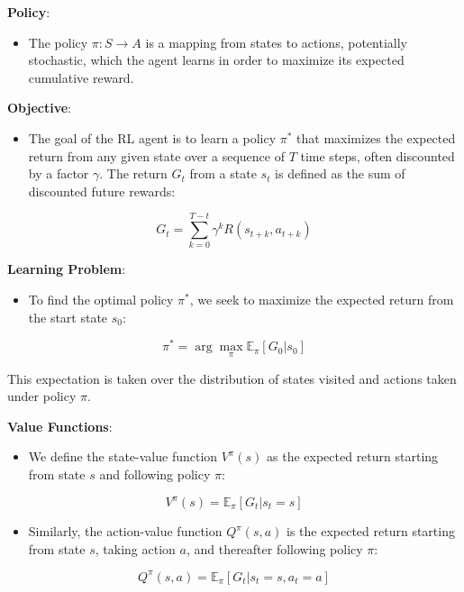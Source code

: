 \textbf{Policy}:

\begin{itemize}
\item
  The policy \(\pi: S \rightarrow A\) is a mapping from states to
  actions, potentially stochastic, which the agent learns in order to
  maximize its expected cumulative reward.
\end{itemize}

\textbf{Objective}:

\begin{itemize}
\item
  The goal of the RL agent is to learn a policy \(\pi^{\ast}\) that
  maximizes the expected return from any given state over a sequence of
  \(T\) time steps, often discounted by a factor \(\gamma\). The return
  \(G_t\) from a state \(s_t\) is defined as the sum of discounted
  future rewards:
\end{itemize}

\[G_t = \sum_{k=0}^{T-t} \gamma^k R(s_{t+k}, a_{t+k})\]

\textbf{Learning Problem}:

\begin{itemize}
\item
  To find the optimal policy \(\pi^{\ast}\), we seek to maximize the
  expected return from the start state \(s_0\):
\end{itemize}

\[\pi^{\ast} = \arg\max_{\pi} \mathbb{E}_{\pi}[G_0 | s_0]\]

This expectation is taken over the distribution of states visited and
actions taken under policy \(\pi\).

\textbf{Value Functions}:

\begin{itemize}
\item
  We define the state-value function \(V^\pi(s)\) as the expected return
  starting from state \(s\) and following policy \(\pi\):
\end{itemize}

\[V^\pi(s) = \mathbb{E}_\pi[G_t | s_t = s]\]

\begin{itemize}
\item
  Similarly, the action-value function \(Q^\pi(s, a)\) is the expected
  return starting from state \(s\), taking action \(a\), and thereafter
  following policy \(\pi\):
\end{itemize}

\[Q^\pi(s, a) = \mathbb{E}_\pi[G_t | s_t = s, a_t = a]\]

